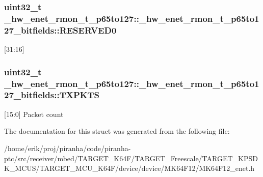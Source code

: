 \subsubsection[{\texorpdfstring{R\+E\+S\+E\+R\+V\+E\+D0}{RESERVED0}}]{\setlength{\rightskip}{0pt plus 5cm}uint32\+\_\+t \+\_\+hw\+\_\+enet\+\_\+rmon\+\_\+t\+\_\+p65to127\+::\+\_\+hw\+\_\+enet\+\_\+rmon\+\_\+t\+\_\+p65to127\+\_\+bitfields\+::\+R\+E\+S\+E\+R\+V\+E\+D0}\hypertarget{struct__hw__enet__rmon__t__p65to127_1_1__hw__enet__rmon__t__p65to127__bitfields_a7d258e4c742335b26a271acdf278ff54}{}\label{struct__hw__enet__rmon__t__p65to127_1_1__hw__enet__rmon__t__p65to127__bitfields_a7d258e4c742335b26a271acdf278ff54}
\mbox{[}31\+:16\mbox{]} 
\subsubsection[{\texorpdfstring{T\+X\+P\+K\+TS}{TXPKTS}}]{\setlength{\rightskip}{0pt plus 5cm}uint32\+\_\+t \+\_\+hw\+\_\+enet\+\_\+rmon\+\_\+t\+\_\+p65to127\+::\+\_\+hw\+\_\+enet\+\_\+rmon\+\_\+t\+\_\+p65to127\+\_\+bitfields\+::\+T\+X\+P\+K\+TS}\hypertarget{struct__hw__enet__rmon__t__p65to127_1_1__hw__enet__rmon__t__p65to127__bitfields_ab0e217276e2adb9fc6513d8eed17609d}{}\label{struct__hw__enet__rmon__t__p65to127_1_1__hw__enet__rmon__t__p65to127__bitfields_ab0e217276e2adb9fc6513d8eed17609d}
\mbox{[}15\+:0\mbox{]} Packet count 

The documentation for this struct was generated from the following file\+:\begin{DoxyCompactItemize}
\item 
/home/erik/proj/piranha/code/piranha-\/ptc/src/receiver/mbed/\+T\+A\+R\+G\+E\+T\+\_\+\+K64\+F/\+T\+A\+R\+G\+E\+T\+\_\+\+Freescale/\+T\+A\+R\+G\+E\+T\+\_\+\+K\+P\+S\+D\+K\+\_\+\+M\+C\+U\+S/\+T\+A\+R\+G\+E\+T\+\_\+\+M\+C\+U\+\_\+\+K64\+F/device/device/\+M\+K64\+F12/M\+K64\+F12\+\_\+enet.\+h\end{DoxyCompactItemize}
